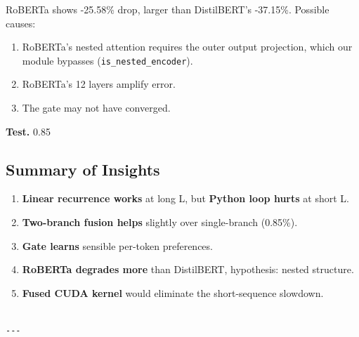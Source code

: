 RoBERTa shows -25.58\% drop, larger than DistilBERT's -37.15\%. 
Possible causes:

\begin{enumerate}
\item RoBERTa's nested attention requires the outer output projection, which
  our module bypasses (\texttt{is\_nested\_encoder}).
\item RoBERTa's 12 layers amplify error.
\item The gate may not have converged.

\end{enumerate}
\textbf{Test.} 0.85

\subsection{Summary of Insights}

\begin{enumerate}
\item \textbf{Linear recurrence works} at long L, but \textbf{Python loop hurts} at short L.
\item \textbf{Two-branch fusion helps} slightly over single-branch (0.85\%).
\item \textbf{Gate learns} sensible per-token preferences.
\item \textbf{RoBERTa degrades more} than DistilBERT, hypothesis: nested structure.
\item \textbf{Fused CUDA kernel} would eliminate the short-sequence slowdown.
\end{enumerate}
\begin{lstlisting}

---
\end{lstlisting}